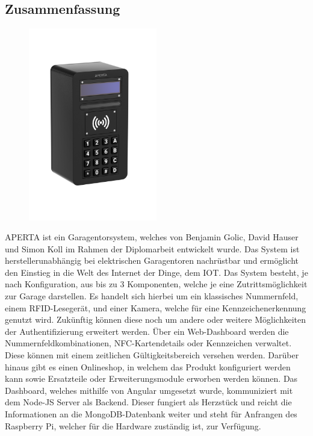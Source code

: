 \newpage
\begin{spacing}{1}
  \chapter*{Zusammenfassung}
\end{spacing}
\begin{figure}
  \begin{center}
    \includegraphics[width=0.5\textwidth]{pics/all-in-package.png}
  \end{center}
\end{figure}
APERTA ist ein Garagentorsystem, welches von Benjamin Golic, David Hauser und Simon Koll im Rahmen der Diplomarbeit entwickelt wurde. Das System ist herstellerunabhängig bei elektrischen Garagentoren nachrüstbar und ermöglicht den Einstieg in die Welt des Internet der Dinge, dem IOT. Das System besteht, je nach Konfiguration, aus bis zu 3 Komponenten, welche je eine Zutrittsmöglichkeit zur Garage darstellen. Es handelt sich hierbei um ein klassisches Nummernfeld, einem RFID-Lesegerät, und einer Kamera, welche für eine Kennzeichenerkennung genutzt wird. Zukünftig können diese noch um andere oder weitere Möglichkeiten der Authentifizierung erweitert werden. Über ein Web-Dashboard werden die Nummernfeldkombinationen, NFC-Kartendetails oder Kennzeichen verwaltet. Diese können mit einem zeitlichen Gültigkeitsbereich versehen werden. Darüber hinaus gibt es einen Onlineshop, in welchem das Produkt konfiguriert werden kann sowie Ersatzteile oder Erweiterungsmodule erworben werden können. Das Dashboard, welches mithilfe von Angular umgesetzt wurde, kommuniziert mit dem Node-JS Server als Backend. Dieser fungiert als Herzstück und reicht die Informationen an die MongoDB-Datenbank weiter und steht für Anfrangen des Raspberry Pi, welcher für die Hardware zuständig ist, zur Verfügung.



